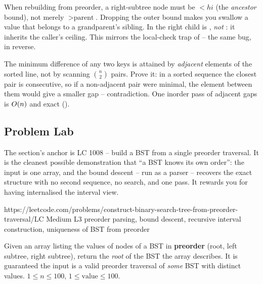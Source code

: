 \begin{warningbox}
When rebuilding from preorder, a right-subtree node must be $<\mathit{hi}$ (the \emph{ancestor} bound),
not merely $>\text{parent}$. Dropping the outer bound makes you swallow a value that belongs to a
grandparent's sibling. In  the right child is , \emph{not}
: it inherits the caller's ceiling. This mirrors the local-check trap of
 -- the same bug, in reverse.
\end{warningbox}

\begin{warningbox}
The minimum difference of any two keys is attained by \emph{adjacent} elements of the sorted line, not
by scanning $\binom{n}{2}$ pairs. Prove it: in a sorted sequence the closest pair is consecutive, so
if a non-adjacent pair were minimal, the element between them would give a smaller gap -- contradiction.
One inorder pass of adjacent gaps is $O(n)$ and exact ().
\end{warningbox}

\subsection{Problem Lab}

The section's anchor is LC 1008 -- build a BST from a single preorder traversal. It is the cleanest
possible demonstration that ``a BST knows its own order'': the input is one array, and the bound
descent --  run as a parser -- recovers the exact structure with no second
sequence, no search, and one pass. It rewards you for having internalised the interval view.

  {https://leetcode.com/problems/construct-binary-search-tree-from-preorder-traversal/}{LC Medium L3}
  {preorder parsing, bound descent, recursive interval construction, uniqueness of BST from preorder}

\begin{problemstatement}
Given an array  listing the values of nodes of a BST in \textbf{preorder} (root, left
subtree, right subtree), return the \emph{root} of the BST the array describes. It is guaranteed the
input is a valid preorder traversal of \emph{some} BST with distinct values. $1\le n\le 100$,
$1\le \text{value}\le 100$.
\end{problemstatement}

